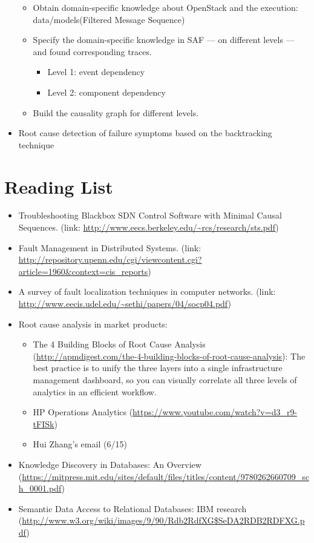 \documentclass{article}
\begin{document}
\begin{itemize}
\begin{itemize}
  \item Obtain domain-specific knowledge about OpenStack and the execution:
    data/models(Filtered Message Sequence)
  \item Specify the domain-specific knowledge in SAF --- on different levels ---
    and found corresponding traces.
    \begin{itemize}
    \item Level 1: event dependency
    \item Level 2: component dependency
    \end{itemize}
  \item Build the causality graph for different levels.
  \end{itemize}
\item Root cause detection of failure symptoms based on the backtracking technique
\end{itemize}

\section{Reading List}
\label{sec:read}

\begin{itemize}

\item Troubleshooting Blackbox SDN Control Software with Minimal Causal
Sequences. (link: \url{http://www.eecs.berkeley.edu/~rcs/research/sts.pdf})

\item Fault Management in Distributed Systems. (link:
\url{http://repository.upenn.edu/cgi/viewcontent.cgi?article=1960&context=cis_reports}) 

\item A survey of fault localization techniques in computer networks. (link:
  \url{http://www.eecis.udel.edu/~sethi/papers/04/socp04.pdf})

\item Root cause analysis in market products:

  \begin{itemize}
  \item The 4 Building Blocks of Root Cause Analysis
    (\url{http://apmdigest.com/the-4-building-blocks-of-root-cause-analysis}): The
    best practice is to unify the three layers into a single infrastructure
    management dashboard, so you can visually correlate all three levels of
    analytics in an efficient workflow.
  \item HP Operations Analytics (\url{https://www.youtube.com/watch?v=d3_r9-tFISk})
  \item Hui Zhang's email (6/15)
  \end{itemize}

\item Knowledge Discovery in Databases: An Overview 
(\url{https://mitpress.mit.edu/sites/default/files/titles/content/9780262660709_sch_0001.pdf})

\item Semantic Data Access to Relational Databases: IBM research
(\url{http://www.w3.org/wiki/images/9/90/Rdb2RdfXG$SeDA2RDB2RDFXG.pdf})

\end{itemize}
\end{document}

